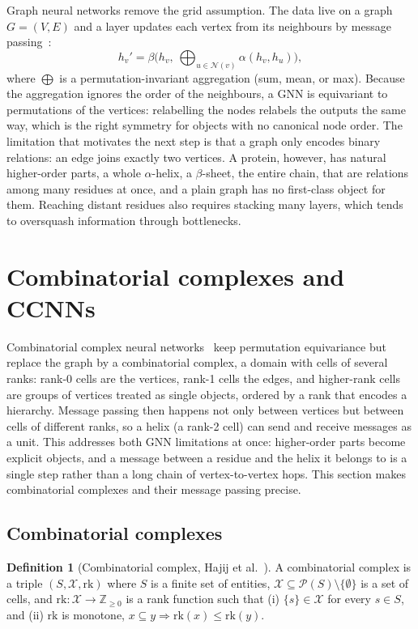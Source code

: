 \documentclass[11pt,a4paper]{article}
\theoremstyle{definition}
\newtheorem{definition}{Definition}
\begin{document}
Graph neural networks remove the grid assumption. The data live on a graph
$G=(V,E)$ and a layer updates each vertex from its neighbours by message
passing~\cite{mpnn}:
\[
 h_v'=\beta\!\Big(h_v,\ \textstyle\bigoplus_{u\in\mathcal{N}(v)}\alpha(h_v,h_u)\Big),
\]
where $\bigoplus$ is a permutation-invariant aggregation (sum, mean, or max).
Because the aggregation ignores the order of the neighbours, a GNN is equivariant
to permutations of the vertices: relabelling the nodes relabels the outputs the
same way, which is the right symmetry for objects with no canonical node order.
The limitation that motivates the next step is that a graph only encodes binary
relations: an edge joins exactly two vertices. A protein, however, has natural
higher-order parts, a whole $\alpha$-helix, a $\beta$-sheet, the entire chain,
that are relations among many residues at once, and a plain graph has no
first-class object for them. Reaching distant residues also requires stacking
many layers, which tends to oversquash information through bottlenecks.



\section{Combinatorial complexes and CCNNs}
\label{sec:ccnn}

Combinatorial complex neural networks~\cite{hoan} keep permutation equivariance
but replace the graph by a combinatorial complex, a domain with cells of several
ranks: rank-0 cells are the vertices, rank-1 cells the edges, and higher-rank
cells are groups of vertices treated as single objects, ordered by a rank that
encodes a hierarchy. Message passing then happens not only between vertices but
between cells of different ranks, so a helix (a rank-2 cell) can send and receive
messages as a unit. This addresses both GNN limitations at once: higher-order
parts become explicit objects, and a message between a residue and the helix it
belongs to is a single step rather than a long chain of vertex-to-vertex hops.
This section makes combinatorial complexes and their message passing precise.

\subsection{Combinatorial complexes}

\begin{definition}[Combinatorial complex, Hajij et al.~\cite{hoan}]
A combinatorial complex is a triple $(S,\mathcal{X},\mathrm{rk})$ where $S$ is a
finite set of entities, $\mathcal{X}\subseteq\mathcal{P}(S)\setminus\{\emptyset\}$
is a set of cells, and $\mathrm{rk}:\mathcal{X}\to\mathbb{Z}_{\ge 0}$ is a rank
function such that (i) $\{s\}\in\mathcal{X}$ for every $s\in S$, and (ii)
$\mathrm{rk}$ is monotone, $x\subseteq y\Rightarrow\mathrm{rk}(x)\le\mathrm{rk}(y)$.
\end{definition}
\end{document}
